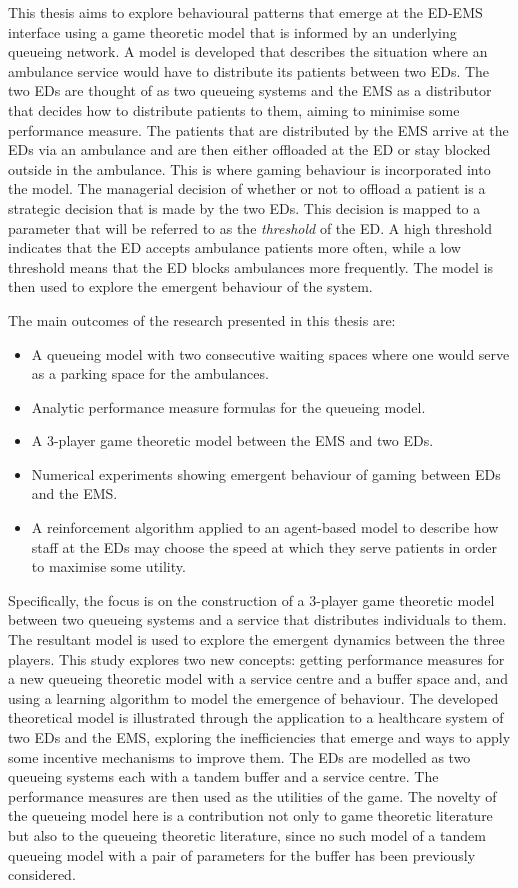 This thesis aims to explore behavioural patterns that emerge at the ED-EMS
interface using a game theoretic model that is informed by an underlying
queueing network.
A model is developed that describes the situation where an ambulance service
would have to distribute its patients between two EDs.
The two EDs are thought of as two queueing systems and the EMS as a distributor
that decides how to distribute patients to them, aiming to minimise some
performance measure.
The patients that are distributed by the EMS arrive at the EDs via an ambulance
and are then either offloaded at the ED or stay blocked outside in the
ambulance.
This is where gaming behaviour is incorporated into the model.
The managerial decision of whether or not to offload a patient is a strategic
decision that is made by the two EDs.
This decision is mapped to a parameter that will be referred to as the
\textit{threshold} of the ED.
A high threshold indicates that the ED accepts ambulance patients more often,
while a low threshold means that the ED blocks ambulances more frequently.
The model is then used to explore the emergent behaviour of the system.

The main outcomes of the research presented in this thesis are:
\begin{itemize}
    \item A queueing model with two consecutive waiting spaces where one would
    serve as a parking space for the ambulances.
    \item Analytic performance measure formulas for the queueing model.
    \item A 3-player game theoretic model between the EMS and two EDs.
    \item Numerical experiments showing emergent behaviour of gaming between
    EDs and the EMS.
    \item A reinforcement algorithm applied to an agent-based model to describe
    how staff at the EDs may choose the speed at which they serve patients in
    order to maximise some utility.
\end{itemize}

Specifically, the focus is on the construction of a 3-player game theoretic
model between two queueing systems and a service that distributes individuals
to them.
The resultant model is used to explore the emergent dynamics between the three
players.
This study explores two new concepts: getting performance measures for a new
queueing theoretic model with a service centre and a buffer space and, and
using a learning algorithm to model the emergence of behaviour.
The developed theoretical model is illustrated through the application to
a healthcare system of two EDs and the EMS, exploring the inefficiencies that
emerge and ways to apply some incentive mechanisms to improve them.
The EDs are modelled as two queueing systems each with a tandem buffer and a
service centre.
The performance measures are then used as the utilities of the game.
The novelty of the queueing model here is a contribution not only to game
theoretic literature but also to the queueing theoretic literature, since
no such model of a tandem queueing model with a pair of parameters for the
buffer has been previously considered.

